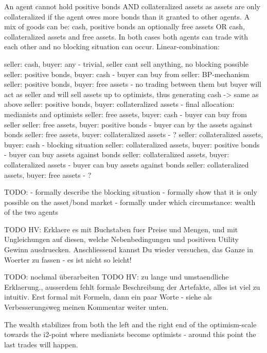 \documentclass[Bachelorarbeit.tex]{subfiles}
\begin{document}
An agent cannot hold positive bonds AND collateralized assets as assets are only collateralized if the agent owes more bonds than it granted to other agents.
A mix of goods can be: cash, positive bonds an optionally free assets OR cash, collateralized assets and free assets. In both cases both agents can trade with each other and no blocking situation can occur. Linear-combination:

seller: cash, buyer: any - trivial, seller cant sell anything, no blocking possible
seller: positive bonds, buyer: cash - buyer can buy from seller: BP-mechanism
seller: positive bonds, buyer: free assets - no trading between them but buyer will act as seller and will sell assets up to optimists, thus generating cash -> same as above
seller: positive bonds, buyer: collateralized assets - final allocation: medianists and optimists
seller: free assets, buyer: cash - buyer can buy from seller
seller: free assets, buyer: positive bonds - buyer can by the assets against bonds
seller: free assets, buyer: collateralized assets - ?
seller: collateralized assets, buyer: cash - blocking situation
seller: collateralized assets, buyer: positive bonds - buyer can buy assets against bonds
seller: collateralized assets, buyer: collateralized assets - buyer can buy assets against bonds
seller: collateralized assets, buyer: free assets - ?


TODO:
- formally describe the blocking situation
- formally show that it is only possible on the asset/bond market
- formally under which circumstance: wealth of the two agents

TODO HV: Erklaere es mit Buchstaben fuer Preise und Mengen, und mit Ungleichungen auf diesen, welche Nebenbedingungen und positiven Utility Gewinn ausdruecken. Anschliessend kannst Du wieder versuchen, das Ganze in Woerter zu fassen - es ist nicht so leicht!











TODO: nochmal überarbeiten
TODO HV: zu lange und umstaendliche Erklaerung., ausserdem fehlt formale Beschreibung der Artefakte, alles ist viel zu intuitiv. Erst formal mit Formeln, dann ein paar Worte - siehe als Verbesserungsweg meinen Kommentar weiter unten.


The wealth stabilizes from both the left and the right end of the optimism-scale towards the i2-point where medianists become optimists - around this point the last trades will happen.
\end{document}
